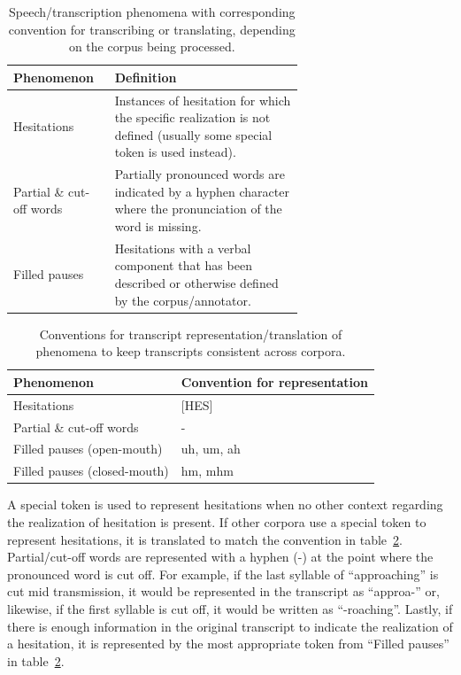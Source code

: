 \documentclass[12pt]{article}
\begin{document}
\begin{table}[h!]
    \centering
    \begin{tabular}{l p{0.65\linewidth}}
        \toprule
        Phenomenon               & Definition                                                                                                              \\
        \midrule
        Hesitations              & Instances of hesitation for which the specific realization is not defined (usually some special token is used instead). \\
        \midrule
        Partial \& cut-off words & Partially pronounced words are indicated by a hyphen character where the pronunciation of the word is missing.          \\
        \midrule
        Filled pauses            & Hesitations with a verbal component that has been described or otherwise defined by the corpus/annotator.               \\
        \bottomrule
    \end{tabular}
    \caption{Speech/transcription phenomena with corresponding convention for transcribing or translating, depending on the corpus being processed.}
    \label{tab:phenomena_definitions}
\end{table}



\begin{table}[h!]
    \centering
    \begin{tabular}{l l}
        \toprule
        Phenomenon                   & Convention for representation \\
        \midrule
        Hesitations                  & [HES]                         \\
        \midrule
        Partial \& cut-off words     & -                             \\
        \midrule
        Filled pauses (open-mouth)   & uh, um, ah                    \\
        \midrule
        Filled pauses (closed-mouth) & hm, mhm                       \\
        \bottomrule
    \end{tabular}
    \caption{Conventions for transcript representation/translation of phenomena to keep transcripts consistent across corpora.}
    \label{tab:phenomena_conventions}
\end{table}

A special token is used to represent hesitations when no other context regarding the realization of hesitation is present. If other corpora use a
special token to represent hesitations, it is translated to match the convention in table~\ref{tab:phenomena_conventions}. Partial/cut-off words
are represented with a hyphen (-) at the point where the pronounced word is cut off. For example, if the last syllable of ``approaching'' is cut
mid transmission, it would be represented in the transcript as ``approa-'' or, likewise, if the first syllable is cut off, it would be written as
``-roaching''. Lastly, if there is enough information in the original transcript to indicate the realization of a hesitation, it is represented by
the most appropriate token from ``Filled pauses'' in table~\ref{tab:phenomena_conventions}.
\end{document}
